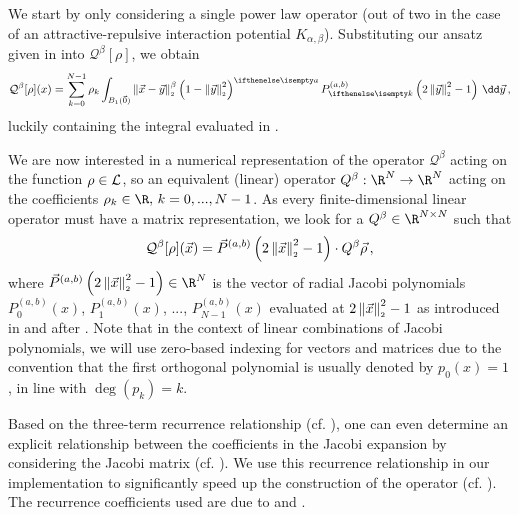 We start by only considering a single power law operator (out of two in the case of an attractive-repulsive interaction potential $K_{\alpha, \beta}$).
Substituting our ansatz given in  into $\mathcal{Q}^\beta[\rho]$, we obtain
\begin{equation}
  \mathcal{Q}^{\beta}[\rho](x) = \sum_{k=0}^{N-1} \rho_{k} \int_{B_1(\vec{0})} \norm{\vec{x}-\vec{y}}^{\beta} \weight{y}\jacobi{y} \,\dd\vec{y}\,,
  \label{eq:theorem216-in-derivation}
\end{equation}
luckily containing the integral evaluated in .

We are now interested in a numerical representation of the operator $\mathcal{Q}^\beta$ acting on the function $\rho \in \mathcal{L}$, so an equivalent (linear) operator $Q^\beta: \R^N \to \R^N$ acting on the coefficients $\rho_k \in \R,\, k = 0, ..., N-1$.
As every finite-dimensional linear operator must have a matrix representation, we look for a $Q^\beta \in \R^{N \times N}$ such that
$$\mathcal{Q}^\beta[\rho](\vec{x}) = \vec{P}^{(a, b)}\left(2 \left\lVert\vec{x}\right\rVert_{\scriptscriptstyle 2}^2 - 1\right) \cdot Q^\beta \vec{\rho}\,,$$
where $\jacobivec{x} \in \R^N$ is the vector of radial Jacobi polynomials $P^{(a, b)}_0(x)$, $P^{(a, b)}_1(x)$, ..., $P^{(a, b)}_{N-1}(x)$ evaluated at $2\left\lVert\vec{x}\right\rVert_{\scriptscriptstyle 2}^2 - 1$ as introduced in and after .
Note that in the context of linear combinations of Jacobi polynomials, we will use zero-based indexing for vectors and matrices due to the convention that the first orthogonal polynomial is usually denoted by $p_0(x) = 1$, in line with $\deg(p_k) = k$.

Based on the three-term recurrence relationship (cf. ), one can even determine an explicit relationship between the coefficients in the Jacobi expansion by considering the Jacobi matrix (cf. ).
We use this recurrence relationship in our implementation to significantly speed up the construction of the operator (cf. ).
The recurrence coefficients used are due to \cite{2021-arbitrary-dimensions} and \cite{2023-olver-equilibrium-measures-jl}.

